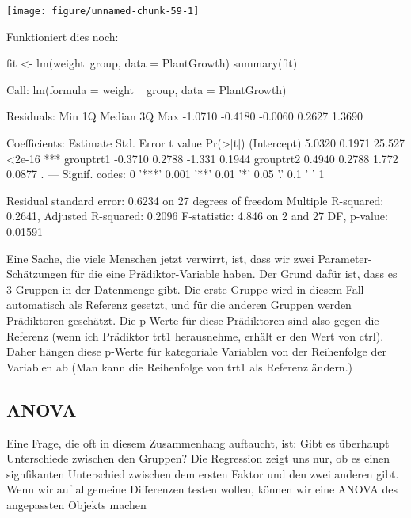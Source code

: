 \documentclass[a4paper,twoside]{tufte-book}\usepackage[]{graphicx}\usepackage[]{color}
\makeatletter
\def\maxwidth{ %
	\ifdim\Gin@nat@width>\linewidth
	\linewidth
	\else
	\Gin@nat@width
	\fi
}
\makeatother
\begin{document}
\begin{appendices}
\begin{Schunk}
\texttt{[image: figure/unnamed-chunk-59-1]} \end{Schunk}

Funktioniert dies noch:

\begin{Schunk}
\begin{Sinput}
fit <- lm(weight~group, data = PlantGrowth)
summary(fit)
\end{Sinput}
\begin{Soutput}

Call:
lm(formula = weight ~ group, data = PlantGrowth)

Residuals:
    Min      1Q  Median      3Q     Max 
-1.0710 -0.4180 -0.0060  0.2627  1.3690 

Coefficients:
            Estimate Std. Error t value Pr(>|t|)    
(Intercept)   5.0320     0.1971  25.527   <2e-16 ***
grouptrt1    -0.3710     0.2788  -1.331   0.1944    
grouptrt2     0.4940     0.2788   1.772   0.0877 .  
---
Signif. codes:  0 '***' 0.001 '**' 0.01 '*' 0.05 '.' 0.1 ' ' 1

Residual standard error: 0.6234 on 27 degrees of freedom
Multiple R-squared:  0.2641,	Adjusted R-squared:  0.2096 
F-statistic: 4.846 on 2 and 27 DF,  p-value: 0.01591
\end{Soutput}
\end{Schunk}

Eine Sache, die viele Menschen jetzt verwirrt, ist, dass wir zwei Parameter-Schätzungen für die eine Prädiktor-Variable haben. Der Grund dafür ist, dass es 3 Gruppen in der Datenmenge gibt. Die erste Gruppe wird in diesem Fall automatisch als Referenz gesetzt, und für die anderen Gruppen werden Prädiktoren geschätzt. Die p-Werte für diese Prädiktoren sind also gegen die Referenz (wenn ich Prädiktor trt1 herausnehme, erhält er den Wert von ctrl). Daher hängen diese p-Werte für kategoriale Variablen von der Reihenfolge der Variablen ab (Man kann die Reihenfolge von trt1 als Referenz ändern.)


\subsection{ANOVA}

Eine Frage, die oft in diesem Zusammenhang auftaucht, ist: Gibt es überhaupt Unterschiede zwischen den Gruppen? Die Regression zeigt uns nur, ob es einen signfikanten Unterschied zwischen dem ersten Faktor und den zwei anderen gibt. Wenn wir auf allgemeine Differenzen testen wollen, können wir eine ANOVA des angepassten Objekts machen


\end{appendices}
\end{document}
